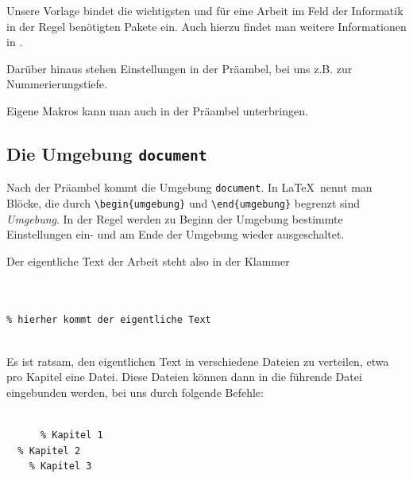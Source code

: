 Unsere Vorlage bindet die wichtigsten und für eine Arbeit im Feld der
Informatik in der Regel benötigten Pakete ein. Auch hierzu findet man
weitere Informationen in \cite{partosch15}.

Darüber hinaus stehen Einstellungen in der Präambel, bei uns z.B. zur
Nummerierungstiefe.

Eigene Makros kann man auch in der Präambel unterbringen.

\subsection{Die Umgebung \texttt{document}}

Nach der Präambel kommt die Umgebung \verb=document=. In \LaTeX\ nennt
man Blöcke, die durch \verb=\begin{umgebung}= und \verb=\end{umgebung}=
begrenzt sind \emph{Umgebung}. In der Regel werden zu Beginn der
Umgebung bestimmte Einstellungen ein- und am Ende der Umgebung wieder
ausgeschaltet.

Der eigentliche Text der Arbeit steht also in der Klammer

\begin{lstlisting}


% hierher kommt der eigentliche Text


\end{lstlisting}


Es ist ratsam, den eigentlichen Text in verschiedene Dateien zu
verteilen, etwa pro Kapitel eine Datei. Diese Dateien können dann in die
führende Datei eingebunden werden, bei uns durch folgende Befehle:

\begin{lstlisting}

      % Kapitel 1
  % Kapitel 2
    % Kapitel 3

\end{lstlisting}

